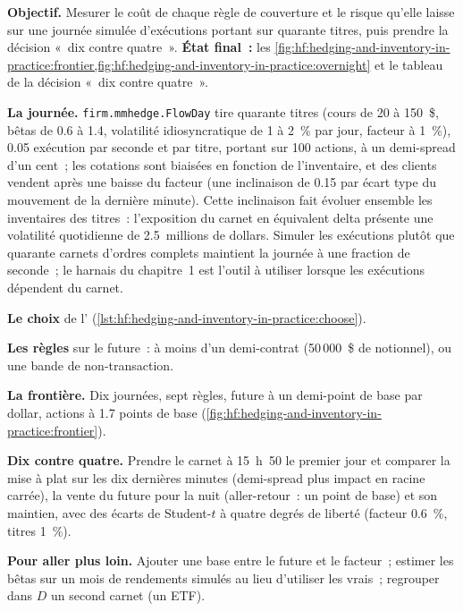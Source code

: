 \begin{tutorial}
\textbf{Objectif.} Mesurer le coût de chaque règle de couverture et le risque qu'elle laisse sur une journée simulée d'exécutions portant sur quarante titres, puis prendre la décision «~dix contre quatre~».
\textbf{État final~:} les \cref{fig:hf:hedging-and-inventory-in-practice:frontier,fig:hf:hedging-and-inventory-in-practice:overnight} et le tableau
de la décision «~dix contre quatre~».
\begin{tutsteps}
\item \textbf{La journée.} \texttt{firm.mmhedge.FlowDay} tire quarante titres (cours de 20 à 150~\$, bêtas de 0.6 à 1.4, volatilité idiosyncratique de 1 à 2~\% par jour,
facteur à 1~\%), 0.05 exécution par seconde et par titre, portant sur 100 actions, à un demi-spread d'un cent~; les cotations sont biaisées en fonction de l'inventaire, et des clients vendent après une baisse du
facteur (une inclinaison de 0.15 par écart type du mouvement de la dernière minute). Cette inclinaison fait évoluer ensemble les inventaires des titres~: l'exposition du
carnet en équivalent delta présente une volatilité quotidienne de 2.5~millions de dollars. Simuler les exécutions plutôt que quarante carnets d'ordres complets maintient la journée à une fraction
de seconde~; le harnais du chapitre~1 est l'outil à utiliser lorsque les exécutions dépendent du carnet.
\item \textbf{Le choix} de l' (\cref{lst:hf:hedging-and-inventory-in-practice:choose}).
\label{lst:hf:hedging-and-inventory-in-practice:choose}
\item \textbf{Les règles} sur le future~: à moins d'un demi-contrat (50\,000~\$ de notionnel), ou une bande de non-transaction.
\label{lst:hf:hedging-and-inventory-in-practice:band}
\item \textbf{La frontière.} Dix journées, sept règles, future à un demi-point de base par dollar, actions à 1.7 points de base (\cref{fig:hf:hedging-and-inventory-in-practice:frontier}).
\item \textbf{Dix contre quatre.} Prendre le carnet à 15~h~50 le premier jour et comparer la mise à plat sur les dix dernières minutes (demi-spread plus impact
en racine carrée), la vente du future pour la nuit (aller-retour~: un point de base) et son maintien, avec des écarts de Student-$t$ à quatre degrés de liberté (facteur 0.6~\%,
titres 1~\%).
\end{tutsteps}
\textbf{Pour aller plus loin.} Ajouter une base entre le future et le facteur~; estimer les bêtas sur un mois de rendements simulés au lieu
d'utiliser les vrais~; regrouper dans $D$ un second carnet (un ETF).
\end{tutorial}

